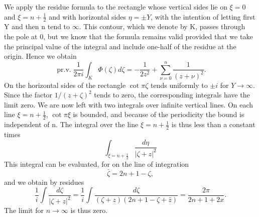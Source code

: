 We apply the residue formula to the rectangle whose vertical sides lie on $\xi = 0$ and $\xi = n + \frac{1}{2}$ and with horizontal sides $\eta = \pm Y$, with the intention of letting first Y and then n tend to $\infty$. This contour, which we denote by K, passes through the pole at 0, but we know that the formula remains valid provided that we take the principal value of the integral and include one-half of the residue at the origin. Hence we obtain
\begin{equation*}
\operatorname{pr.v.} \frac {1}{2 \pi i} \int_ {K} \Phi (\zeta) d \zeta = - \frac {1}{2 z ^ {2}} + \sum_ {\nu = 0} ^ {n} \frac {1}{(z + \nu) ^ {2}}.
\end{equation*}
On the horizontal sides of the rectangle $\cot\pi\zeta$ tends uniformly to $\pm i$ for $Y\to\infty$. Since the factor $1/(z+\zeta)^{2}$ tends to zero, the corresponding integrals have the limit zero. We are now left with two integrals over infinite vertical lines. On each line $\xi=n+\frac{1}{2}$, $\cot\pi\xi$ is bounded, and because of the periodicity the bound is independent of n. The integral over the line $\xi=n+\frac{1}{2}$ is thus less than a constant times
\begin{equation*}
\int_ {\xi = n + \frac {1}{2}} \frac {d \eta}{| \zeta + z | ^ {2}}
\end{equation*}
This integral can be evaluated, for on the line of integration
\begin{equation*}
\bar {\zeta} = 2 n + 1 - \zeta ,
\end{equation*}
and we obtain by residues
\begin{equation*}
\frac {1}{i} \int \frac {d \zeta}{| \zeta + z | ^ {2}} = \frac {1}{i} \int \frac {d \zeta}{(\zeta + z) (2 n + 1 - \zeta + \bar {z})} = \frac {2 \pi}{2 n + 1 + 2 x}.
\end{equation*}
The limit for $n \to \infty$ is thus zero.

